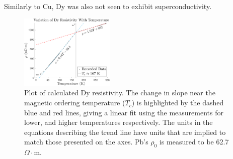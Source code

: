 \documentclass[prl,twocolumn,superscriptaddress,floatfix]{revtex4}
\begin{document}
Similarly to Cu, Dy was also not seen to exhibit superconductivity.
\begin{figure}[ht]
    \begin{center}
    \includegraphics[width = 0.4\textwidth]{dy_final.pdf}
    \caption{Plot of calculated Dy resistivity. The change in slope near the magnetic ordering temperature ($T_c$) is highlighted by the dashed blue and red lines, giving a linear fit using the measurements for lower, and higher temperatures respectively. The units in the equations describing the trend line have units that are implied to match those presented on the axes. Pb's $\rho_0$ is measured to be 62.7 $\Omega \cdot$m.}
    \label{fig:resistivity_temp_dy}
    \end{center}
\end{figure}
\end{document}

